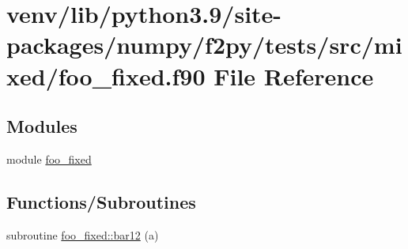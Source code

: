 \hypertarget{foo__fixed_8f90}{}\section{venv/lib/python3.9/site-\/packages/numpy/f2py/tests/src/mixed/foo\+\_\+fixed.f90 File Reference}
\label{foo__fixed_8f90}
\subsection*{Modules}
\begin{DoxyCompactItemize}
\item 
module \hyperlink{namespacefoo__fixed}{foo\+\_\+fixed}
\end{DoxyCompactItemize}
\subsection*{Functions/\+Subroutines}
\begin{DoxyCompactItemize}
\item 
subroutine \hyperlink{namespacefoo__fixed_afa9b18960bf23d2ade846f9e12bfd07d}{foo\+\_\+fixed\+::bar12} (a)
\end{DoxyCompactItemize}
